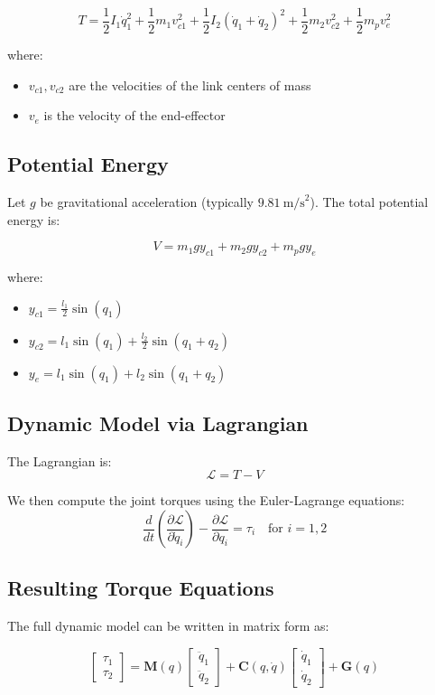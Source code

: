 \documentclass[a4paper,12pt]{article}
\begin{document}
\[
T = \frac{1}{2} I_1 \dot{q}_1^2 
+ \frac{1}{2} m_1 v_{c1}^2 
+ \frac{1}{2} I_2 (\dot{q}_1 + \dot{q}_2)^2 
+ \frac{1}{2} m_2 v_{c2}^2 
+ \frac{1}{2} m_p v_e^2
\]

\noindent where:
\begin{itemize}
    \item $v_{c1}, v_{c2}$ are the velocities of the link centers of mass
    \item $v_e$ is the velocity of the end-effector
\end{itemize}

\subsection*{Potential Energy}

Let $g$ be gravitational acceleration (typically $9.81~\text{m/s}^2$). The total potential energy is:

\[
V = m_1 g y_{c1} + m_2 g y_{c2} + m_p g y_e
\]

\noindent where:
\begin{itemize}
    \item $y_{c1} = \frac{l_1}{2} \sin(q_1)$
    \item $y_{c2} = l_1 \sin(q_1) + \frac{l_2}{2} \sin(q_1 + q_2)$
    \item $y_e = l_1 \sin(q_1) + l_2 \sin(q_1 + q_2)$
\end{itemize}

\subsection*{Dynamic Model via Lagrangian}

The Lagrangian is:
\[
\mathcal{L} = T - V
\]

We then compute the joint torques using the Euler-Lagrange equations:
\[
\frac{d}{dt} \left( \frac{\partial \mathcal{L}}{\partial \dot{q}_i} \right) - \frac{\partial \mathcal{L}}{\partial q_i} = \tau_i \quad \text{for } i = 1, 2
\]

\subsection*{Resulting Torque Equations}

The full dynamic model can be written in matrix form as:

\[
\begin{bmatrix}
\tau_1 \\
\tau_2
\end{bmatrix}
=
\mathbf{M}(q)
\begin{bmatrix}
\ddot{q}_1 \\
\ddot{q}_2
\end{bmatrix}
+
\mathbf{C}(q, \dot{q})
\begin{bmatrix}
\dot{q}_1 \\
\dot{q}_2
\end{bmatrix}
+
\mathbf{G}(q)
\]
\end{document}
